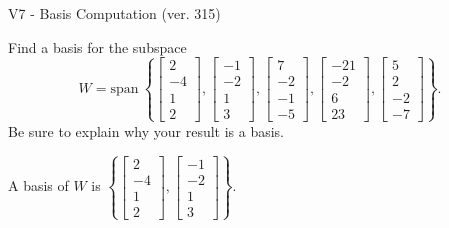 \begin{exercise}
  \begin{exerciseTitle}V7 - Basis Computation (ver. 315)\end{exerciseTitle}
  \begin{exerciseStatement}
    Find a basis for the subspace 
\[W=\mathrm{span}\ \left\{\left[\begin{array}{r}
2 \\
-4 \\
1 \\
2
\end{array}\right] , \left[\begin{array}{r}
-1 \\
-2 \\
1 \\
3
\end{array}\right] , \left[\begin{array}{r}
7 \\
-2 \\
-1 \\
-5
\end{array}\right] , \left[\begin{array}{r}
-21 \\
-2 \\
6 \\
23
\end{array}\right] , \left[\begin{array}{r}
5 \\
2 \\
-2 \\
-7
\end{array}\right]\right\}.\]
 Be sure to explain why your result is a basis.


  \end{exerciseStatement}
  \begin{exerciseAnswer}
   A basis of \(W\) is  \(\left\{\left[\begin{array}{r}
2 \\
-4 \\
1 \\
2
\end{array}\right] , \left[\begin{array}{r}
-1 \\
-2 \\
1 \\
3
\end{array}\right]\right\}\).
  


  \end{exerciseAnswer}
\end{exercise}